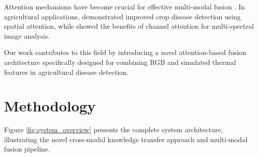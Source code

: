\documentclass[conference]{IEEEtran}
\begin{document}
Attention mechanisms have become crucial for effective multi-modal fusion \cite{vaswani2017attention}. In agricultural applications, \cite{zhang2019attention} demonstrated improved crop disease detection using spatial attention, while \cite{li2020multi} showed the benefits of channel attention for multi-spectral image analysis.

Our work contributes to this field by introducing a novel attention-based fusion architecture specifically designed for combining RGB and simulated thermal features in agricultural disease detection.

\section{Methodology}

Figure \ref{fig:system_overview} presents the complete system architecture, illustrating the novel cross-modal knowledge transfer approach and multi-modal fusion pipeline.
\end{document}
